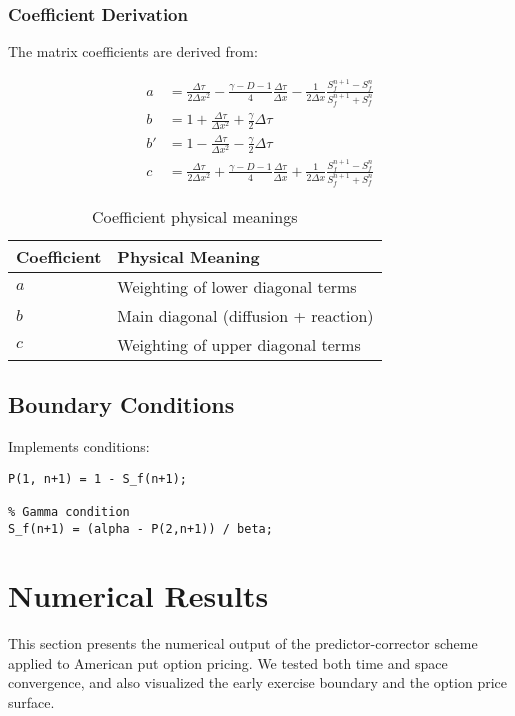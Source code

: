 \documentclass{article}
\begin{document}
\subsubsection{Coefficient Derivation}
The matrix coefficients are derived from:

\begin{align*}
a &= \frac{\Delta\tau}{2\Delta x^2} - \frac{\gamma - D - 1}{4}\frac{\Delta\tau}{\Delta x} - \frac{1}{2\Delta x}\frac{S_f^{n+1} - S_f^n}{S_f^{n+1} + S_f^n} \\
b &= 1 + \frac{\Delta\tau}{\Delta x^2} + \frac{\gamma}{2}\Delta\tau \\
b' &= 1 - \frac{\Delta\tau}{\Delta x^2} - \frac{\gamma}{2}\Delta\tau \\
c &= \frac{\Delta\tau}{2\Delta x^2} + \frac{\gamma - D - 1}{4}\frac{\Delta\tau}{\Delta x} + \frac{1}{2\Delta x}\frac{S_f^{n+1} - S_f^n}{S_f^{n+1} + S_f^n}
\end{align*}

\begin{table}[h]
\centering
\caption{Coefficient physical meanings}
\begin{tabular}{ll}
\hline
Coefficient & Physical Meaning \\ \hline
$a$ & Weighting of lower diagonal terms \\
$b$ & Main diagonal (diffusion + reaction) \\
$c$ & Weighting of upper diagonal terms \\ \hline
\end{tabular}
\end{table}

\subsection{Boundary Conditions}
Implements conditions:
\begin{lstlisting}[caption={Boundary condition implementation}]
% Value-matching condition 
P(1, n+1) = 1 - S_f(n+1);

% Gamma condition 
S_f(n+1) = (alpha - P(2,n+1)) / beta;
\end{lstlisting}

\section*{Numerical Results }

This section presents the numerical output of the predictor-corrector scheme applied to American put option pricing. We tested both time and space convergence, and also visualized the early exercise boundary and the option price surface.
\end{document}
